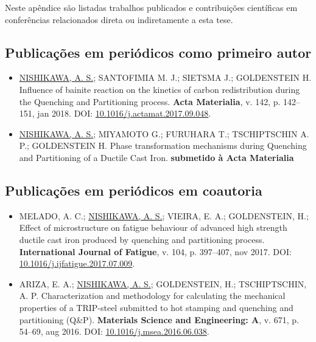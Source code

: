 
Neste apêndice são listadas trabalhos publicados e contribuições científicas em conferências relacionados direta ou indiretamente a esta tese.

\subsection*{Publicações em periódicos como primeiro autor}

\begin{itemize}
	\item \underline{NISHIKAWA, A. S.}; SANTOFIMIA M. J.; SIETSMA J.; GOLDENSTEIN H. Influence of bainite reaction on the kinetics of carbon redistribution during the Quenching and Partitioning process. \textbf{Acta Materialia}, v. 142, p. 142--151, jan 2018. DOI: \href{http://dx.doi.org/10.1016/j.actamat.2017.09.048}{10.1016/j.actamat.2017.09.048}.

	\item \underline{NISHIKAWA, A. S.}; MIYAMOTO G.; FURUHARA T.; TSCHIPTSCHIN A. P.; GOLDENSTEIN H. Phase transformation mechanisms during Quenching and Partitioning of a Ductile Cast Iron. \textbf{submetido à Acta Materialia}
\end{itemize}

\subsection*{Publicações em periódicos em coautoria}

\begin{itemize}
	\item MELADO, A. C.; \underline{NISHIKAWA, A. S.}; VIEIRA, E. A.; GOLDENSTEIN, H.; Effect of microstructure on fatigue behaviour of advanced high strength ductile cast iron produced by quenching and partitioning process. \textbf{International Journal of Fatigue}, v. 104, p. 397–407, nov 2017. DOI: \href{http://dx.doi.org/10.1016/j.ijfatigue.2017.07.009}{10.1016/j.ijfatigue.2017.07.009}.

	\item ARIZA, E. A.; \underline{NISHIKAWA, A. S.}; GOLDENSTEIN, H.; TSCHIPTSCHIN, A. P. Characterization and methodology for calculating the mechanical properties of a TRIP-steel submitted to hot stamping and quenching and partitioning (Q\&P). \textbf{Materials Science and Engineering: A}, v. 671, p. 54–69, aug 2016. DOI: \href{http://dx.doi.org/10.1016/j.msea.2016.06.038}{10.1016/j.msea.2016.06.038}.
\end{itemize}

